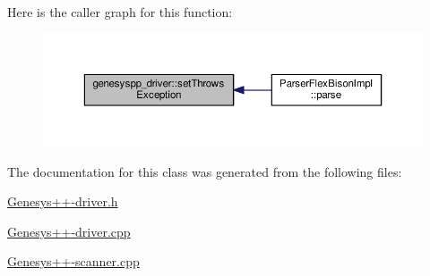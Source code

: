 Here is the caller graph for this function\-:\nopagebreak
\begin{figure}[H]
\begin{center}
\leavevmode
\includegraphics[width=350pt]{classgenesyspp__driver_a00187b9d00b9db5c5ce6ac34fe3d76f0_icgraph}
\end{center}
\end{figure}




The documentation for this class was generated from the following files\-:\begin{DoxyCompactItemize}
\item 
\hyperlink{_genesys_09_09-driver_8h}{Genesys++-\/driver.\-h}\item 
\hyperlink{_genesys_09_09-driver_8cpp}{Genesys++-\/driver.\-cpp}\item 
\hyperlink{_genesys_09_09-scanner_8cpp}{Genesys++-\/scanner.\-cpp}\end{DoxyCompactItemize}
